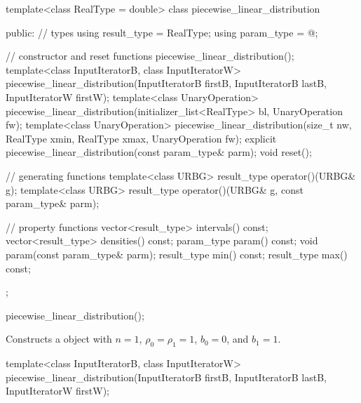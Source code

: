 %
\begin{codeblock}
template<class RealType = double>
  class piecewise_linear_distribution {
  public:
    // types
    using result_type = RealType;
    using param_type  = @\unspec@;

    // constructor and reset functions
    piecewise_linear_distribution();
    template<class InputIteratorB, class InputIteratorW>
      piecewise_linear_distribution(InputIteratorB firstB, InputIteratorB lastB,
                                    InputIteratorW firstW);
    template<class UnaryOperation>
      piecewise_linear_distribution(initializer_list<RealType> bl, UnaryOperation fw);
    template<class UnaryOperation>
      piecewise_linear_distribution(size_t nw, RealType xmin, RealType xmax, UnaryOperation fw);
    explicit piecewise_linear_distribution(const param_type& parm);
    void reset();

    // generating functions
    template<class URBG>
      result_type operator()(URBG& g);
    template<class URBG>
      result_type operator()(URBG& g, const param_type& parm);

    // property functions
    vector<result_type> intervals() const;
    vector<result_type> densities() const;
    param_type param() const;
    void param(const param_type& parm);
    result_type min() const;
    result_type max() const;
  };
\end{codeblock}

\begin{itemdecl}
piecewise_linear_distribution();
\end{itemdecl}

\begin{itemdescr}
\pnum\effects Constructs a  object
 with $ n = 1 $,
 $\rho_0 = \rho_1 = 1 $,
 $ b_0 = 0 $,
 and $ b_1 = 1 $.
\end{itemdescr}

\begin{itemdecl}
template<class InputIteratorB, class InputIteratorW>
 piecewise_linear_distribution(InputIteratorB firstB, InputIteratorB lastB,
                               InputIteratorW firstW);
\end{itemdecl}

